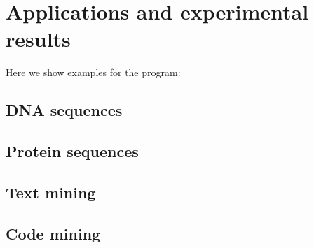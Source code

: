 \chapter{Applications and experimental results}

Here we show examples for the program:

\section{DNA sequences}


\section{Protein sequences}


\section{Text mining}


\section{Code mining}


	